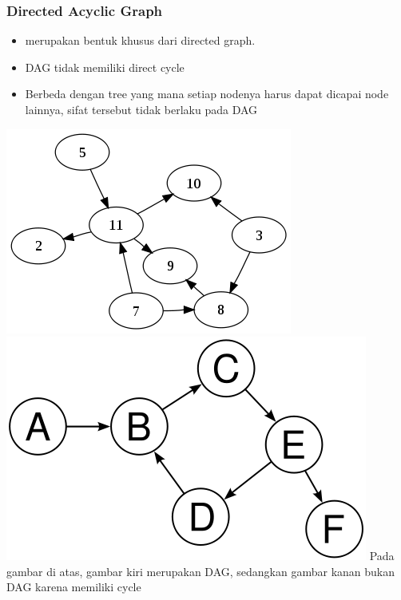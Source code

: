 \begin{frame}
\frametitle{Directed Acyclic Graph}
\begin{itemize}
  \item {} merupakan bentuk khusus dari directed graph.
  \item DAG tidak memiliki \alert{direct cycle}
  \item Berbeda dengan tree yang mana setiap nodenya harus dapat dicapai node lainnya, sifat tersebut tidak berlaku pada DAG
\end{itemize}

\includegraphics[width=4 cm]{asset/dag.png}
\hspace{\fill}
\includegraphics[width=4 cm]{asset/not-dag.png}
\newline\newline
Pada gambar di atas, gambar kiri merupakan DAG, sedangkan gambar kanan bukan DAG karena memiliki cycle
\end{frame}


